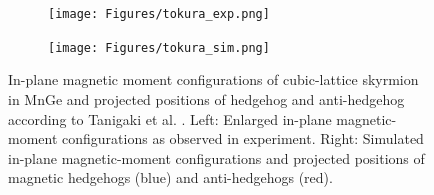 \documentclass [a4paper, 12pt]{article}
\begin{document}



\begin{figure}[h]
	\centering
	\begin{subfigure}{.5\textwidth}
		  \centering
		  \texttt{[image: Figures/tokura\_exp.png]}
		  \label{fig:sub1}
	\end{subfigure}%
	\begin{subfigure}{.5\textwidth}
		  \centering
		  \texttt{[image: Figures/tokura\_sim.png]}
                  \label{fig:sub2}
	\end{subfigure}
	\caption{In-plane magnetic moment configurations of cubic-lattice skyrmion 
		in MnGe and projected positions of hedgehog and anti-hedgehog according to
	        Tanigaki et al. \cite{tanigaki_real-space_2015}.
		Left: Enlarged in-plane magnetic-moment configurations as observed in experiment.
		Right: Simulated in-plane magnetic-moment configurations and projected
		positions of magnetic hedgehogs (blue) and anti-hedgehogs (red).}
		
	\label{fig:tokura_results}
\end{figure}
\end{document}

